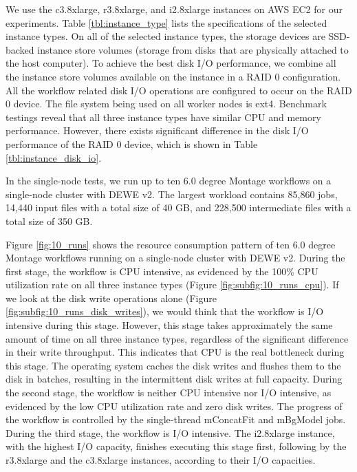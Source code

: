 We use the c3.8xlarge, r3.8xlarge, and i2.8xlarge instances on AWS EC2 for our experiments. Table \ref{tbl:instance_type} lists the specifications of the selected instance types. On all of the selected instance types, the storage devices are SSD-backed instance store volumes (storage from disks that are physically attached to the host computer). To achieve the best disk I/O performance, we combine all the instance store volumes available on the instance in a RAID 0 configuration. All the workflow related disk I/O operations are configured to occur on the RAID 0 device. The file system being used on all worker nodes is ext4. Benchmark testings reveal that all three instance types have similar CPU and memory performance. However, there exists significant difference in the disk I/O performance of the RAID 0 device, which is shown in Table \ref{tbl:instance_disk_io}. 


In the single-node tests, we run up to ten 6.0 degree Montage workflows on a single-node cluster with DEWE v2. The largest workload contains 85,860 jobs, 14,440 input files with a total size of 40 GB, and 228,500 intermediate files with a total size of 350 GB. 

Figure \ref{fig:10_runs} shows the resource consumption pattern of ten 6.0 degree Montage workflows running on a single-node cluster with DEWE v2. During the first stage, the workflow is CPU intensive, as evidenced by the 100\% CPU utilization rate on all three instance types (Figure \ref{fig:subfig:10_runs_cpu}). If we look at the disk write operations alone (Figure \ref{fig:subfig:10_runs_disk_writes}), we would think that the workflow is I/O intensive during this stage. However, this stage takes approximately the same amount of time on all three instance types, regardless of the significant difference in their write throughput. This indicates that CPU is the real bottleneck during this stage. The operating system caches the disk writes and flushes them to the disk in batches, resulting in the intermittent disk writes at full capacity. During the second stage, the workflow is neither CPU intensive nor I/O intensive, as evidenced by the low CPU utilization rate and zero disk writes. The progress of the workflow is controlled by the single-thread mConcatFit and mBgModel jobs. During the third stage, the workflow is  I/O intensive. The i2.8xlarge instance, with the highest I/O capacity, finishes executing this stage first, following by the r3.8xlarge and the c3.8xlarge instances, according to their I/O capacities.




